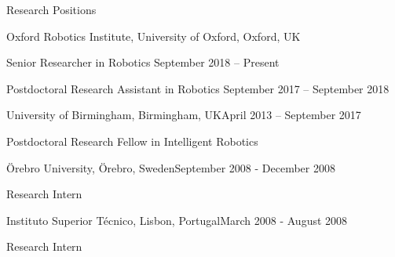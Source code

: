 
\begin{rSection}{Research Positions}

\begin{rSubsection}{Oxford Robotics Institute, University of Oxford, Oxford, UK}{}{}{}
\item Senior Researcher in Robotics \hfill September 2018 -- Present
\item Postdoctoral Research Assistant in Robotics \hfill September 2017 -- September 2018
\end{rSubsection}

\begin{rSubsection}{University of Birmingham, Birmingham, UK}{April 2013 -- September 2017
}{}{}
\item Postdoctoral Research Fellow in Intelligent Robotics 
\end{rSubsection}

\begin{rSubsection}{\"Orebro University, \"Orebro, Sweden}{September 2008 - December 2008}{}{}
\item Research Intern 
\end{rSubsection}

\begin{rSubsection}{Instituto Superior T\'ecnico, Lisbon, Portugal}{March 2008 - August 2008}{}{}
\item Research Intern 
\end{rSubsection}


\end{rSection}

